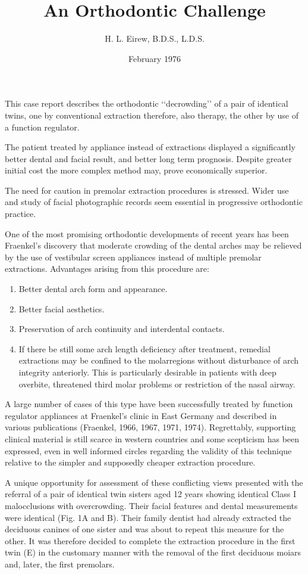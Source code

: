\documentclass{article}
\title{An Orthodontic Challenge}
\author{H. L. Eirew, B.D.S., L.D.S.}
\date{February 1976}
\begin{document}
\maketitle

This case report describes the orthodontic ‘‘decrowding’’ of a pair of identical twins, one by conventional extraction therefore, also therapy, the other by use of a function regulator.

The patient treated by appliance instead of extractions displayed a significantly better dental and facial result, and better long term prognosis.
Despite greater initial cost the more complex method may, prove economically superior.

The need for caution in premolar extraction procedures is stressed.
Wider use and study of facial photographic records seem essential in progressive orthodontic practice.

One of the most promising orthodontic developments of recent years has been Fraenkel’s discovery that moderate crowding of the dental arches may be relieved by the use of vestibular screen appliances instead of multiple premolar extractions.
Advantages arising from this procedure are:
\begin{enumerate}
\item Better dental arch form and appearance.
\item Better facial aesthetics.
\item Preservation of arch continuity and interdental contacts.
\item If there be still some arch length deficiency after treatment, remedial extractions may be confined to the molarregions without disturbance of arch integrity anteriorly.
This is particularly desirable in patients with deep overbite, threatened third molar problems or restriction of the nasal airway.
\end{enumerate}

A large number of cases of this type have been successfully treated by function regulator appliances at Fraenkel’s clinic in East Germany and described in various publications (Fraenkel, 1966, 1967, 1971, 1974).
Regrettably, supporting clinical material is still scarce in western countries and some scepticism has been expressed, even in well informed circles regarding the validity of this technique relative to the simpler and supposedly cheaper extraction procedure.

A unique opportunity for assessment of these conflicting views presented with the referral of a pair of identical twin sisters aged 12 years showing identical Class I malocclusions with overcrowding.
Their facial features and dental measurements were identical (Fig. 1A and B). Their family dentist had already extracted the deciduous canines of one sister and was about to repeat this measure for the other.
It was therefore decided to complete the extraction procedure in the first twin (E) in the customary manner with the removal of the first deciduous moiars and, later, the first premolars.
\end{document}
